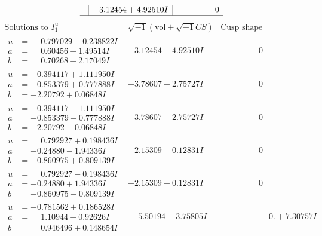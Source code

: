\documentclass[1p]{elsarticle_modified}
\theoremstyle{definition}
\newcommand{\I}{\sqrt{-1}}
\begin{document}
$$\begin{array}{c|c|c}
 & -3.12454 + 4.92510 I & \phantom{-0.000000 } 0\\
 \hline 
 \end{array}$$\newpage$$\begin{array}{c|c|c}  
\text{Solutions to }I^u_{1}& \I (\text{vol} + \sqrt{-1}CS) & \text{Cusp shape}\\
 \hline 
\begin{aligned}
u &= \phantom{-}0.797029 - 0.238822 I \\
a &= \phantom{-}0.60456 - 1.49514 I \\
b &= \phantom{-}0.70268 + 2.17049 I\end{aligned}
 & -3.12454 - 4.92510 I & \phantom{-0.000000 } 0 \\ \hline\begin{aligned}
u &= -0.394117 + 1.111950 I \\
a &= -0.853379 + 0.777888 I \\
b &= -2.20792 + 0.06848 I\end{aligned}
 & -3.78607 + 2.75727 I & \phantom{-0.000000 } 0 \\ \hline\begin{aligned}
u &= -0.394117 - 1.111950 I \\
a &= -0.853379 - 0.777888 I \\
b &= -2.20792 - 0.06848 I\end{aligned}
 & -3.78607 - 2.75727 I & \phantom{-0.000000 } 0 \\ \hline\begin{aligned}
u &= \phantom{-}0.792927 + 0.198436 I \\
a &= -0.24880 - 1.94336 I \\
b &= -0.860975 + 0.809139 I\end{aligned}
 & -2.15309 - 0.12831 I & \phantom{-0.000000 } 0 \\ \hline\begin{aligned}
u &= \phantom{-}0.792927 - 0.198436 I \\
a &= -0.24880 + 1.94336 I \\
b &= -0.860975 - 0.809139 I\end{aligned}
 & -2.15309 + 0.12831 I & \phantom{-0.000000 } 0 \\ \hline\begin{aligned}
u &= -0.781562 + 0.186528 I \\
a &= \phantom{-}1.10944 + 0.92626 I \\
b &= \phantom{-}0.946496 + 0.148654 I\end{aligned}
 & \phantom{-}5.50194 - 3.75805 I & \phantom{-0.000000 -}0. + 7.30757 I \\ \hline\begin{aligned}

\end{aligned}
\end{array}$$
\end{document}
